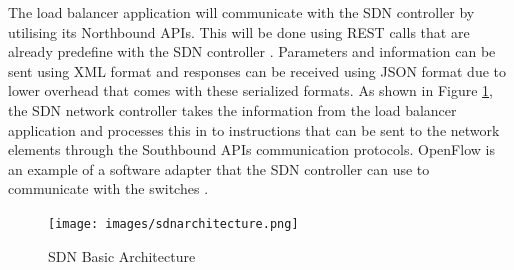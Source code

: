 \newline
\par
The load balancer application will communicate with the SDN controller by utilising its Northbound APIs. This will be done using REST calls that are already predefine with the SDN controller \cite{northbound}. Parameters and information can be sent using XML format and responses can be received using JSON format due to lower overhead that comes with these serialized formats. As shown in Figure \ref{fig:sdnarch}, the SDN network controller takes the information from the load balancer application and processes this in to instructions that can be sent to the network elements through the Southbound APIs communication protocols. OpenFlow is an example of a software adapter that the SDN controller can use to communicate with the switches \cite{southbound}.

\begin{figure}[h!]
 \centering
 \texttt{[image: images/sdnarchitecture.png]}
 \caption{SDN Basic Architecture \cite{sdnarch}}
 \label{fig:sdnarch}
\end{figure}

